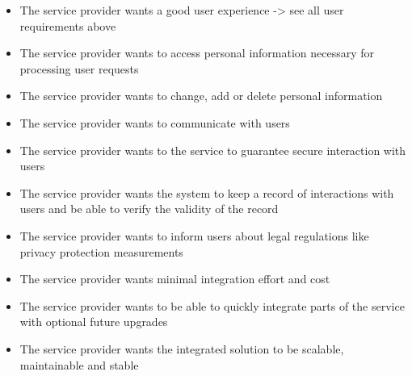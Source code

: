 \begin{itemize}
    
    \item The service provider wants a good user experience -> see all user requirements above
    
    \item The service provider wants to access personal information necessary for processing user requests
    
    \item The service provider wants to change, add or delete personal information
    
    \item The service provider wants to communicate with users
    
    \item The service provider wants to the service to guarantee secure interaction with users
    
    \item The service provider wants the system to keep a record of interactions with users and be able to verify the validity of the record
    
    \item The service provider wants to inform users about legal regulations like privacy protection measurements
    
    \item The service provider wants minimal integration effort and cost
    
    \item The service provider wants to be able to quickly integrate parts of the service with optional future upgrades
    
    \item The service provider wants the integrated solution to be scalable, maintainable and stable

\end{itemize}